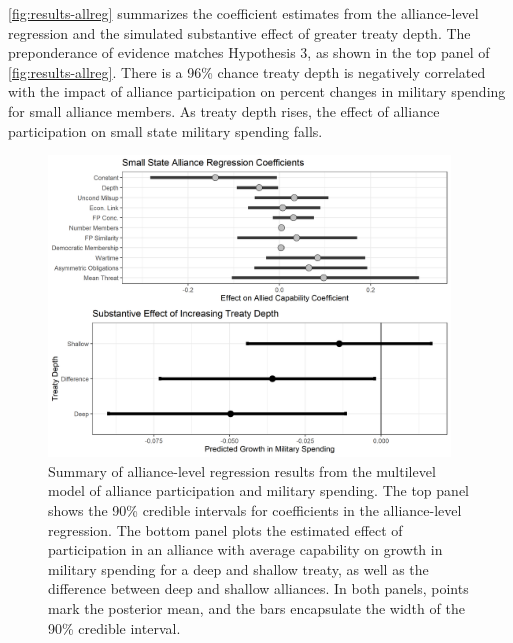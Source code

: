 \documentclass[12pt]{article}
\begin{document}
\autoref{fig:results-allreg} summarizes the coefficient estimates from the alliance-level regression and the simulated substantive effect of greater treaty depth. 
The preponderance of evidence matches Hypothesis 3, as shown in the top panel of \autoref{fig:results-allreg}.
There is a 96\% chance treaty depth is negatively correlated with the impact of alliance participation on percent changes in military spending for small alliance members.
As treaty depth rises, the effect of alliance participation on small state military spending falls. 


\begin{figure}[htbp]
	\centering
		\includegraphics[width=0.95\textwidth]{../figures/results-allreg.png}
	\caption{Summary of alliance-level regression results from the multilevel model of alliance participation and military spending. The top panel shows the 90\% credible intervals for coefficients in the alliance-level regression. The bottom panel plots the estimated effect of participation in an alliance with average capability on growth in military spending for a deep and shallow treaty, as well as the difference between deep and shallow alliances. In both panels, points mark the posterior mean, and the bars encapsulate the width of the 90\% credible interval.}
	\label{fig:results-allreg}
\end{figure}
\end{document}
